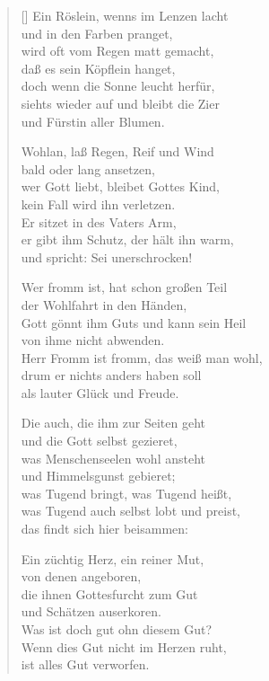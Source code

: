 \begin{multicols}{2}
\begin{verse}[\versewidth]
 Ein Röslein, wenns im Lenzen lacht\\
und in den Farben pranget,\\
wird oft vom Regen matt gemacht,\\
daß es sein Köpflein hanget,\\
doch wenn die Sonne leucht herfür,\\
siehts wieder auf und bleibt die Zier\\
und Fürstin aller Blumen.

 Wohlan, laß Regen, Reif und Wind\\
bald oder lang ansetzen,\\
wer Gott liebt, bleibet Gottes Kind,\\
kein Fall wird ihn verletzen.\\
Er sitzet in des Vaters Arm,\\
er gibt ihm Schutz, der hält ihn warm,\\
und spricht: Sei unerschrocken!

 Wer fromm ist, hat schon großen Teil\\
der Wohlfahrt in den Händen,\\
Gott gönnt ihm Guts und kann sein Heil\\
von ihme nicht abwenden.\\
Herr Fromm ist fromm, das weiß man wohl,\\
drum er nichts anders haben soll\\
als lauter Glück und Freude.

 Die auch, die ihm zur Seiten geht\\
und die Gott selbst gezieret,\\
was Menschenseelen wohl ansteht\\
und Himmelsgunst gebieret;\\
was Tugend bringt, was Tugend heißt,\\
was Tugend auch selbst lobt und preist,\\
das findt sich hier beisammen:

 Ein züchtig Herz, ein reiner Mut,\\
von denen angeboren,\\
die ihnen Gottesfurcht zum Gut\\
und Schätzen auserkoren.\\
Was ist doch gut ohn diesem Gut?\\
Wenn dies Gut nicht im Herzen ruht,\\
ist alles Gut verworfen.


\end{verse}
\end{multicols}
